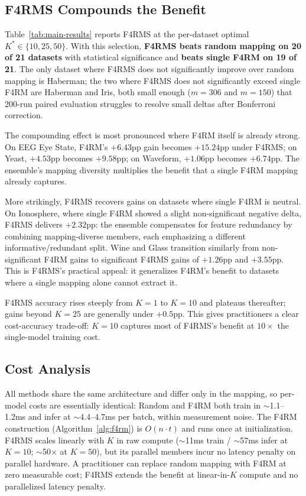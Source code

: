 \documentclass[runningheads]{llncs}
\begin{document}
\subsection{F4RMS Compounds the Benefit}
\label{sec:results-f4rms}

Table~\ref{tab:main-results} reports F4RMS at the per-dataset optimal $K^* \in \{10, 25, 50\}$. With this selection, \textbf{F4RMS beats random mapping on 20 of 21 datasets} with statistical significance and \textbf{beats single F4RM on 19 of 21}. The only dataset where F4RMS does not significantly improve over random mapping is Haberman; the two where F4RMS does not significantly exceed single F4RM are Haberman and Iris, both small enough ($m = 306$ and $m = 150$) that 200-run paired evaluation struggles to resolve small deltas after Bonferroni correction.

The compounding effect is most pronounced where F4RM itself is already strong. On EEG Eye State, F4RM's $+6.43$pp gain becomes $+15.24$pp under F4RMS; on Yeast, $+4.53$pp becomes $+9.58$pp; on Waveform, $+1.06$pp becomes $+6.74$pp. The ensemble's mapping diversity multiplies the benefit that a single F4RM mapping already captures.

More strikingly, F4RMS recovers gains on datasets where single F4RM is neutral. On Ionosphere, where single F4RM showed a slight non-significant negative delta, F4RMS delivers $+2.32$pp: the ensemble compensates for feature redundancy by combining mapping-diverse members, each emphasizing a different informative/redundant split. Wine and Glass transition similarly from non-significant F4RM gains to significant F4RMS gains of $+1.26$pp and $+3.55$pp. This is F4RMS's practical appeal: it generalizes F4RM's benefit to datasets where a single mapping alone cannot extract it.

F4RMS accuracy rises steeply from $K=1$ to $K=10$ and plateaus thereafter; gains beyond $K=25$ are generally under $+0.5$pp. This gives practitioners a clear cost-accuracy trade-off: $K=10$ captures most of F4RMS's benefit at $10\times$ the single-model training cost.

\subsection{Cost Analysis}
\label{sec:results-cost}

All methods share the same architecture and differ only in the mapping, so per-model costs are essentially identical: Random and F4RM both train in $\sim$1.1--1.2ms and infer at $\sim$4.4--4.7ms per batch, within measurement noise. The F4RM construction (Algorithm~\ref{alg:f4rm}) is $O(n \cdot t)$ and runs once at initialization. F4RMS scales linearly with $K$ in raw compute ($\sim$11ms train / $\sim$57ms infer at $K=10$; $\sim$50$\times$ at $K=50$), but its parallel members incur no latency penalty on parallel hardware. A practitioner can replace random mapping with F4RM at zero measurable cost; F4RMS extends the benefit at linear-in-$K$ compute and no parallelized latency penalty.
\end{document}

